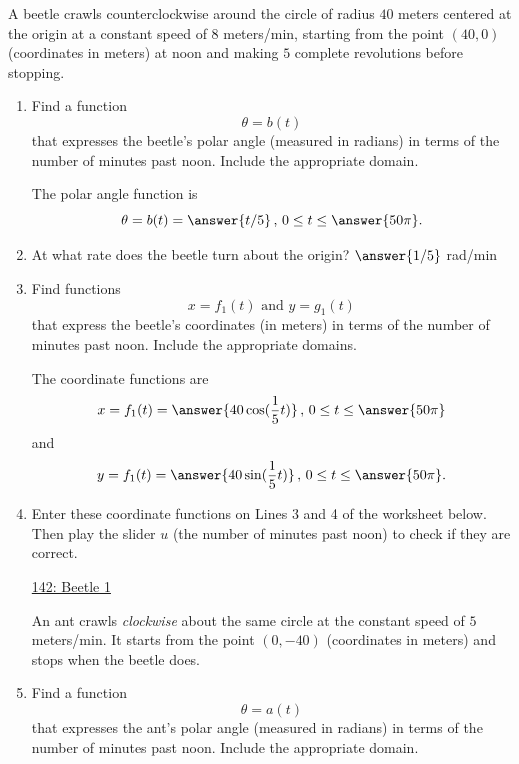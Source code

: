 \documentclass{ximera}
\begin{document}
\begin{example} \label{Edfhg]hghgdfg}
A beetle crawls counterclockwise around the circle of radius $40$ meters centered at the origin at a constant speed of $8$ meters/min, starting from the point $(40,0)$ (coordinates in meters) at noon and making $5$ complete revolutions before stopping.

\begin{enumerate}

\item Find a function
\[
    \theta = b(t)
\]
that expresses the beetle's polar angle (measured in radians) in terms of the number of minutes past noon. Include the appropriate domain.

The polar angle function is
\[
   \theta = b(t) = \answer{t/5} \, , \, 0 \leq t \leq \answer{50\pi} .
\]

\item At what rate does the beetle turn about the origin?  $\answer{1/5}$ rad/min



\item Find functions
\[
   x = f_1(t) \text{ and } y=g_1(t)
\]
that express the beetle's coordinates (in meters)  in terms of the number of minutes past noon. Include the appropriate domains.

The coordinate functions are
\[
    x = f_1(t) = \answer{40\cos(\frac{1}{5}t)} \, , \, 0 \leq t \leq \answer{50\pi} 
\]
and 
\[
    y = f_1(t) = \answer{40\sin(\frac{1}{5}t)} \, , \, 0 \leq t \leq \answer{50\pi} .
\]

\item Enter these coordinate functions on Lines 3 and 4 of the worksheet below. Then play the slider $u$ (the number of minutes past noon) to check if they are correct.

\begin{onlineOnly}
    \begin{center}
\end{center}
\end{onlineOnly}

\href{https://www.desmos.com/calculator/pygmcbcogi}{142: Beetle 1}



An ant crawls \emph{clockwise} about the same circle at the constant speed of $5$ meters/min. It starts from the point $(0,-40)$  (coordinates in meters) and stops when the beetle does.

\item Find a function
\[
    \theta = a(t)
\]
that expresses the ant's polar angle (measured in radians) in terms of the number of minutes past noon. Include the appropriate domain.


\end{enumerate}
\end{example}
\end{document}
